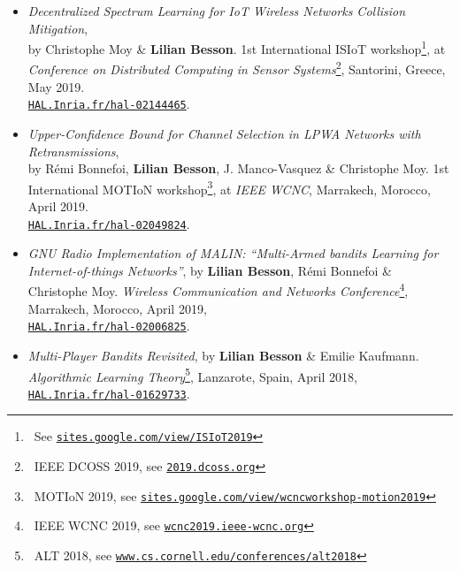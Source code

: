 \begin{itemize}

\item
    \emph{Decentralized Spectrum Learning for IoT Wireless Networks Collision Mitigation},\\
    by Christophe Moy \& \textbf{Lilian Besson}.
    1st International ISIoT workshop\footnote{~See \href{https://sites.google.com/view/ISIoT2019}{\texttt{sites.google.com/view/ISIoT2019}}},
    at \emph{Conference on Distributed Computing in Sensor Systems}\footnote{~IEEE DCOSS 2019, see \href{http://2019.dcoss.org}{\texttt{2019.dcoss.org}}}, Santorini, Greece, May 2019.\\
    \href{https://HAL.Inria.fr/hal-02144465}{\texttt{HAL.Inria.fr/hal-02144465}}.
    \cite{MoyBesson2019}

\item
    \emph{Upper-Confidence Bound for Channel Selection in LPWA Networks with Retransmissions},\\
    by Rémi Bonnefoi, \textbf{Lilian Besson}, J. Manco-Vasquez \& Christophe Moy.
    1st International MOTIoN workshop\footnote{~MOTIoN 2019, see \href{https://sites.google.com/view/wcncworkshop-motion2019}{\texttt{sites.google.com/view/wcncworkshop-motion2019}}},
    at \emph{IEEE WCNC}, Marrakech, Morocco, April 2019.\\
    \href{https://HAL.Inria.fr/hal-02049824}{\texttt{HAL.Inria.fr/hal-02049824}}.
    \cite{Bonnefoi2019WCNC}

\item
    \emph{GNU Radio Implementation of MALIN: ``Multi-Armed bandits Learning for Internet-of-things Networks''},
    by \textbf{Lilian Besson}, Rémi Bonnefoi \& Christophe Moy.
    \emph{Wireless Communication and Networks Conference}\footnote{~IEEE WCNC 2019, see \href{http://wcnc2019.ieee-wcnc.org}{\texttt{wcnc2019.ieee-wcnc.org}}}, Marrakech, Morocco, April 2019,\\
    \href{https://HAL.Inria.fr/hal-02006825}{\texttt{HAL.Inria.fr/hal-02006825}}.
    \cite{Besson2019WCNC}

\item
    \emph{Multi-Player Bandits Revisited},
    by \textbf{Lilian Besson} \& Emilie Kaufmann.
    \emph{Algorithmic Learning Theory}\footnote{~ALT 2018, see \href{http://www.cs.cornell.edu/conferences/alt2018}{\texttt{www.cs.cornell.edu/conferences/alt2018}}}, Lanzarote, Spain, April 2018,
    \href{https://HAL.Inria.fr/hal-01629733}{\texttt{HAL.Inria.fr/hal-01629733}}.
    \cite{Besson2018ALT}


\end{itemize}
